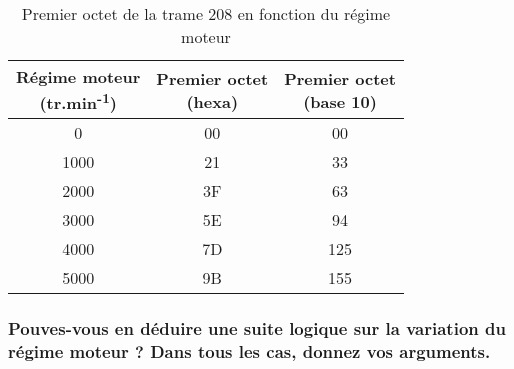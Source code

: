 \documentclass{rapportECC}
\begin{document}
\begin{comment}
\begin{table}[H]
    \begin{tabular}{|l|l|l|}
    \hline
    \textbf{Régime moteur (tr.min\textsuperscript{-1})} & \textbf{Premier octet (hexa)} & \textbf{Premier octet (base 10)} \\ \hline
    0  & 00       & 00 \\
    1000                               & 21       & 33 \\
    2000                               & 3F       & 63 \\
    3000                               & 5E       & 94 \\
    4000                               & 7D       & 125\\   
    5000                               & 9B       & 155\\  
    \end{tabular}
    \caption{Premier octet de la trame 208 en fonction du régime moteur}
    \label{tab:regime moteur trame 208}
\end{table}
\end{comment}

\begingroup
\begin{table}[H]
    \centering
    \begin{tabular}{c c c}
        \toprule
        \makecell{\textbf{Régime moteur}\\ \textbf{(tr.min\textsuperscript{-1})}} & \makecell{\textbf{Premier octet}\\ \textbf{(hexa)}} & \makecell{\textbf{Premier octet}\\ \textbf{(base 10)}} \\
        \midrule
        0    & 00 & 00 \\
        1000 & 21 & 33 \\
        2000 & 3F & 63 \\
        3000 & 5E & 94 \\
        4000 & 7D & 125 \\
        5000 & 9B & 155 \\
        \bottomrule
    \end{tabular}
    \caption{Premier octet de la trame 208 en fonction du régime moteur}
    \label{tab:regime_moteur_trame_208}
\end{table}
\endgroup

\subsubsection*{Pouves-vous en déduire une suite logique sur la variation du régime moteur ? Dans tous les cas, donnez vos arguments.}
\end{document}

